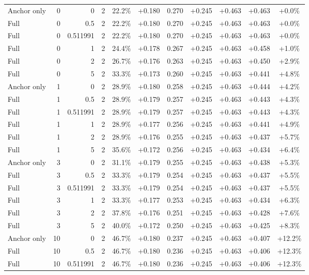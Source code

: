 \begin{table}[htbp]
\begin{tabular}{lrrrccccccc}
Anchor only & 0 & 0 & 2 & 22.2\% & +0.180 & 0.270 & +0.245 & +0.463 & +0.463 & +0.0\% \\
Full & 0 & 0.5 & 2 & 22.2\% & +0.180 & 0.270 & +0.245 & +0.463 & +0.463 & +0.0\% \\
Full & 0 & 0.511991 & 2 & 22.2\% & +0.180 & 0.270 & +0.245 & +0.463 & +0.463 & +0.0\% \\
Full & 0 & 1 & 2 & 24.4\% & +0.178 & 0.267 & +0.245 & +0.463 & +0.458 & +1.0\% \\
Full & 0 & 2 & 2 & 26.7\% & +0.176 & 0.263 & +0.245 & +0.463 & +0.450 & +2.9\% \\
Full & 0 & 5 & 2 & 33.3\% & +0.173 & 0.260 & +0.245 & +0.463 & +0.441 & +4.8\% \\
Anchor only & 1 & 0 & 2 & 28.9\% & +0.180 & 0.258 & +0.245 & +0.463 & +0.444 & +4.2\% \\
Full & 1 & 0.5 & 2 & 28.9\% & +0.179 & 0.257 & +0.245 & +0.463 & +0.443 & +4.3\% \\
Full & 1 & 0.511991 & 2 & 28.9\% & +0.179 & 0.257 & +0.245 & +0.463 & +0.443 & +4.3\% \\
Full & 1 & 1 & 2 & 28.9\% & +0.177 & 0.256 & +0.245 & +0.463 & +0.441 & +4.9\% \\
Full & 1 & 2 & 2 & 28.9\% & +0.176 & 0.255 & +0.245 & +0.463 & +0.437 & +5.7\% \\
Full & 1 & 5 & 2 & 35.6\% & +0.172 & 0.256 & +0.245 & +0.463 & +0.434 & +6.4\% \\
Anchor only & 3 & 0 & 2 & 31.1\% & +0.179 & 0.255 & +0.245 & +0.463 & +0.438 & +5.3\% \\
Full & 3 & 0.5 & 2 & 33.3\% & +0.179 & 0.254 & +0.245 & +0.463 & +0.437 & +5.5\% \\
Full & 3 & 0.511991 & 2 & 33.3\% & +0.179 & 0.254 & +0.245 & +0.463 & +0.437 & +5.5\% \\
Full & 3 & 1 & 2 & 33.3\% & +0.177 & 0.253 & +0.245 & +0.463 & +0.434 & +6.3\% \\
Full & 3 & 2 & 2 & 37.8\% & +0.176 & 0.251 & +0.245 & +0.463 & +0.428 & +7.6\% \\
Full & 3 & 5 & 2 & 40.0\% & +0.172 & 0.250 & +0.245 & +0.463 & +0.425 & +8.3\% \\
Anchor only & 10 & 0 & 2 & 46.7\% & +0.180 & 0.237 & +0.245 & +0.463 & +0.407 & +12.2\% \\
Full & 10 & 0.5 & 2 & 46.7\% & +0.180 & 0.236 & +0.245 & +0.463 & +0.406 & +12.3\% \\
Full & 10 & 0.511991 & 2 & 46.7\% & +0.180 & 0.236 & +0.245 & +0.463 & +0.406 & +12.3\% \\

\end{tabular}
\end{table}
